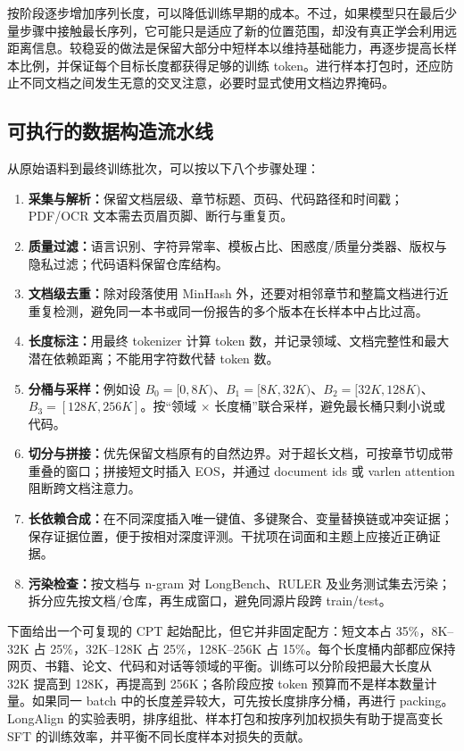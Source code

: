 \documentclass[UTF8,10pt,a4paper,fontset=none]{ctexart}
\newcommand{\key}[1]{\textbf{\color{navy}#1}}
\begin{document}
按阶段逐步增加序列长度，可以降低训练早期的成本。不过，如果模型只在最后少量步骤中接触最长序列，它可能只是适应了新的位置范围，却没有真正学会利用远距离信息。较稳妥的做法是保留大部分中短样本以维持基础能力，再逐步提高长样本比例，并保证每个目标长度都获得足够的训练 token。进行样本打包时，还应防止不同文档之间发生无意的交叉注意，必要时显式使用文档边界掩码。

\subsection{可执行的数据构造流水线}
从原始语料到最终训练批次，可以按以下八个步骤处理：
\begin{enumerate}
\item \key{采集与解析：}保留文档层级、章节标题、页码、代码路径和时间戳；PDF/OCR 文本需去页眉页脚、断行与重复页。
\item \key{质量过滤：}语言识别、字符异常率、模板占比、困惑度/质量分类器、版权与隐私过滤；代码语料保留仓库结构。
\item \key{文档级去重：}除对段落使用 MinHash 外，还要对相邻章节和整篇文档进行近重复检测，避免同一本书或同一份报告的多个版本在长样本中占比过高。
\item \key{长度标注：}用最终 tokenizer 计算 token 数，并记录领域、文档完整性和最大潜在依赖距离；不能用字符数代替 token 数。
\item \key{分桶与采样：}例如设 $B_0=[0,8K)$、$B_1=[8K,32K)$、$B_2=[32K,128K)$、$B_3=[128K,256K]$。按“领域 $\times$ 长度桶”联合采样，避免最长桶只剩小说或代码。
\item \key{切分与拼接：}优先保留文档原有的自然边界。对于超长文档，可按章节切成带重叠的窗口；拼接短文时插入 EOS，并通过 document ids 或 varlen attention 阻断跨文档注意力。
\item \key{长依赖合成：}在不同深度插入唯一键值、多键聚合、变量替换链或冲突证据；保存证据位置，便于按相对深度评测。干扰项在词面和主题上应接近正确证据。
\item \key{污染检查：}按文档与 n-gram 对 LongBench、RULER 及业务测试集去污染；拆分应先按文档/仓库，再生成窗口，避免同源片段跨 train/test。
\end{enumerate}

下面给出一个可复现的 CPT 起始配比，但它并非固定配方：短文本占 35\%，8K--32K 占 25\%，32K--128K 占 25\%，128K--256K 占 15\%。每个长度桶内部都应保持网页、书籍、论文、代码和对话等领域的平衡。训练可以分阶段把最大长度从 32K 提高到 128K，再提高到 256K；各阶段应按 token 预算而不是样本数量计量。如果同一 batch 中的长度差异较大，可先按长度排序分桶，再进行 packing。LongAlign 的实验表明，排序组批、样本打包和按序列加权损失有助于提高变长 SFT 的训练效率，并平衡不同长度样本对损失的贡献\cite{bai2024longalign}。
\end{document}
